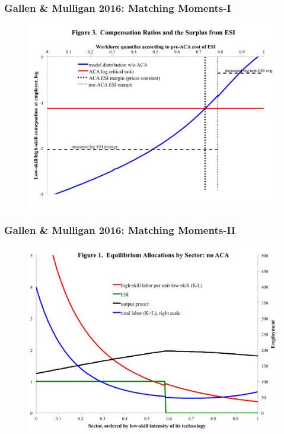 \documentclass{beamer}
\begin{document}
\begin{frame}
\frametitle[alignment=center]{Gallen \& Mulligan 2016: Matching Moments-I}
\begin{figure}
\centering
\includegraphics[scale=0.42]{CompensationRatios.png}
\end{figure}
\end{frame}

\begin{frame}
\frametitle[alignment=center]{Gallen \& Mulligan 2016: Matching Moments-II}
\begin{figure}
\centering
\includegraphics[scale=0.42]{Fig1.png}
\end{figure}
\end{frame}
\end{document}
